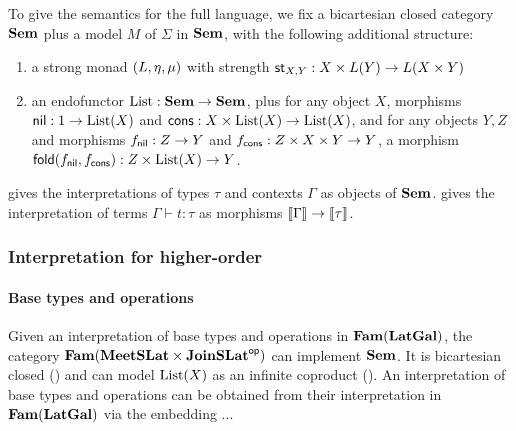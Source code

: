To give the semantics for the full language, we fix a bicartesian closed category $\mathbf{Sem}$ plus a model $M$ of
$\Sigma$ in $\mathbf{Sem}$, with the following additional structure:
\begin{enumerate}
\item a strong monad $(L, \eta, \mu)$ with strength $\mathsf{st}_{X,Y}: X \times L(Y) \to L(X
\times Y)$
\item an endofunctor $\mathrm{List}: \mathbf{Sem} \to \mathbf{Sem}$, plus for any object $X$, morphisms $\mathsf{nil}: 1 \to \mathrm{List}(X)$ and
$\mathsf{cons}: X \times \mathrm{List}(X) \to \mathrm{List}(X)$, and for any objects $Y, Z$ and morphisms $f_{\mathsf{nil}}: Z \to Y$ and
$f_{\mathsf{cons}}: Z \times X \times Y \to Y$, a morphism $\mathsf{fold}(f_{\mathsf{nil}},f_{\mathsf{cons}}): Z \times \mathrm{List}(X) \to Y$.
\end{enumerate}

 gives the interpretations of types $\tau$ and contexts $\Gamma$ as objects of $\mathbf{Sem}$.
 gives the interpretation of terms $\Gamma \vdash t: \tau$ as morphisms $\llbracket \Gamma \rrbracket
\to \llbracket \tau \rrbracket$.

\subsubsection{Interpretation for higher-order \GPS}

\paragraph{Base types and operations}
Given an interpretation of base types and operations in $\mathbf{Fam}(\mathbf{LatGal})$, the category $\mathbf{Fam}(\mathbf{MeetSLat} \times
\mathbf{JoinSLat}^{\mathsf{op}})$ can implement $\mathbf{Sem}$. It is bicartesian closed () and can model
$\mathrm{List}(X)$ as an infinite coproduct (). An interpretation
of base types and operations can be obtained from their interpretation in $\mathbf{Fam}(\mathbf{LatGal})$ via the embedding
...
